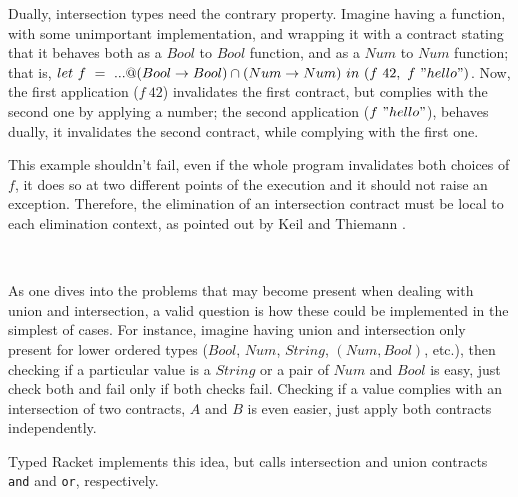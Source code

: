 Dually, intersection types need the contrary property.
Imagine having a function, with some unimportant implementation,
and wrapping it
with a contract stating that it behaves both as a $Bool$ to $Bool$ function,
and as a $Num$ to $Num$ function; that is, 
$let~f~=~...@(Bool \rightarrow Bool) \cap (Num \rightarrow Num)~in~(f~42,~f~"hello")$.
Now, the first application ($f~42$) invalidates the first contract, but complies with the second
one by applying a number; the second application ($f~"hello"$), behaves dually,
it invalidates the second contract,
while complying with the first one.

This example shouldn't fail, even if the whole program invalidates both choices of $f$, it does
so at two different points of the execution and it should not raise an exception.
Therefore, the elimination of an intersection contract must be local to each elimination
context, as pointed out by Keil and Thiemann \cite{KeilThiemannUnionIntersection}.

\\


As one dives into the problems that may become present when dealing with union and intersection,
a valid question is how these could be implemented in the simplest of cases.
For instance, imagine having
union and intersection only present for lower ordered types 
($Bool$, $Num$, $String$, $(Num, Bool)$, etc.), then checking
if a particular value is a $String$ or a pair of $Num$ and $Bool$ is easy,
just check both and fail only if both checks fail.
Checking if a value complies with an intersection of two contracts, $A$ and $B$ is even
easier, just apply both contracts independently.

Typed Racket implements this idea, but calls intersection and union contracts
\texttt{and} and \texttt{or}, respectively.

